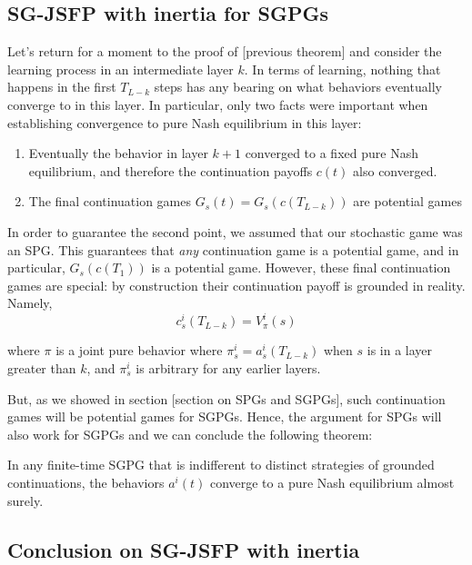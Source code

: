 \subsection{SG-JSFP with inertia for SGPGs}

Let's return for a moment to the proof of [previous theorem] and consider the learning process in an intermediate layer $k$. In terms of learning, nothing that happens in the first $T_{L-k}$ steps has any bearing on what behaviors eventually converge to in this layer. In particular, only two facts were important when establishing convergence to pure Nash equilibrium in this layer:

\begin{enumerate}
\item Eventually the behavior in layer $k+1$ converged to a fixed pure Nash equilibrium, and therefore the continuation payoffs $c(t)$ also converged.

\item The final continuation games $G_s(t) = G_s(c(T_{L-k}))$ are potential games
\end{enumerate}


In order to guarantee the second point, we assumed that our stochastic game was an SPG. This guarantees that {\em any} continuation game is a potential game, and in particular, $G_s(c(T_1))$ is a potential game. However, these final continuation games are special: by construction their continuation payoff is grounded in reality. Namely,
$$
c^i_s(T_{L-k}) = V^i_{\pi}(s)
$$

where $\pi$ is a joint pure behavior where $\pi^i_s = a^i_s(T_{L-k})$ when $s$ is in a layer greater than $k$, and $\pi^i_s$ is arbitrary for any earlier layers. 

But, as we showed in section [section on SPGs and SGPGs], such continuation games will be potential games for SGPGs. Hence, the argument for SPGs will also work for SGPGs and we can conclude the following theorem:

\begin{thm}
In any finite-time SGPG that is indifferent to distinct strategies of grounded continuations, the behaviors $a^i(t)$ converge to a pure Nash equilibrium almost surely.
\end{thm}

\subsection{Conclusion on SG-JSFP with inertia}

